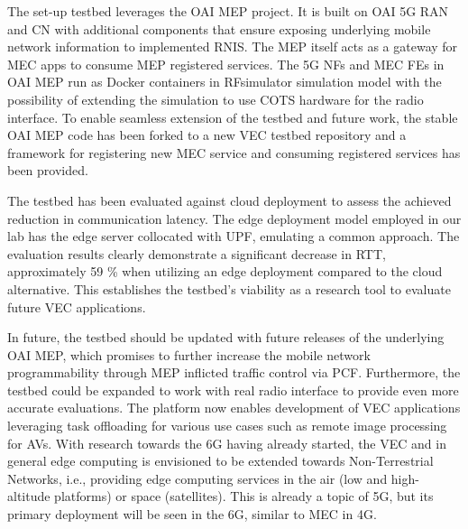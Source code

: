 \documentclass[12pt,a4paper,twoside]{report}
\begin{document}
The set-up testbed leverages the OAI MEP project. It is built on OAI 5G RAN and CN with additional components that ensure exposing underlying mobile network information to implemented RNIS. The MEP itself acts as a gateway for MEC apps to consume MEP registered services. The 5G NFs and MEC FEs in OAI MEP run as Docker containers in RFsimulator simulation model with the possibility of extending the simulation to use COTS hardware for the radio interface. To enable seamless extension of the testbed and future work, the stable OAI MEP code has been forked to a new VEC testbed repository and a framework for registering new MEC service and consuming registered services has been provided. 

The testbed has been evaluated against cloud deployment to assess the achieved reduction in communication latency. The edge deployment model employed in our lab has the edge server collocated with UPF, emulating a common approach. The evaluation results clearly demonstrate a significant decrease in RTT, approximately 59 \% when utilizing an edge deployment compared to the cloud alternative. This establishes the testbed’s viability as a research tool to evaluate future VEC applications. 

In future, the testbed should be updated with future releases of the underlying OAI MEP, which promises to further increase the mobile network programmability through MEP inflicted traffic control via PCF. Furthermore, the testbed could be expanded to work with real radio interface to provide even more accurate evaluations. The platform now enables development of VEC applications leveraging task offloading for various use cases such as remote image processing for AVs. With research towards the 6G having already started, the VEC and in general edge computing is envisioned to be extended towards Non-Terrestrial Networks, i.e., providing edge computing services in the air (low and high-altitude platforms) or space (satellites). This is already a topic of 5G, but its primary deployment will be seen in the 6G, similar to MEC in 4G.





\clearpage

%
\end{document}
